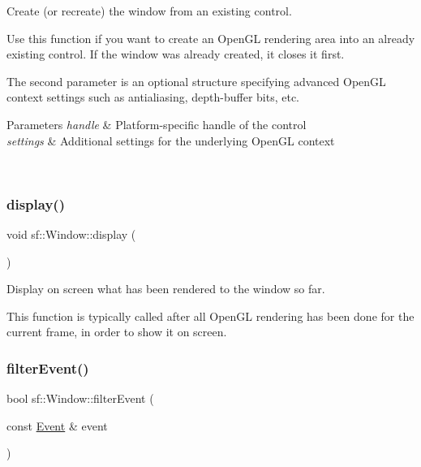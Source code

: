 Create (or recreate) the window from an existing control. 

Use this function if you want to create an Open\+GL rendering area into an already existing control. If the window was already created, it closes it first.

The second parameter is an optional structure specifying advanced Open\+GL context settings such as antialiasing, depth-\/buffer bits, etc.


\begin{DoxyParams}{Parameters}
{\em handle} & Platform-\/specific handle of the control \\
\hline
{\em settings} & Additional settings for the underlying Open\+GL context \begin{DoxyVerb}\end{DoxyVerb}
 \\
\hline
\end{DoxyParams}
\mbox{\label{classsf_1_1_window_adabf839cb103ac96cfc82f781638772a}} 
\subsubsection{\texorpdfstring{display()}{display()}}
{\footnotesize\ttfamily void sf\+::\+Window\+::display (\begin{DoxyParamCaption}{ }\end{DoxyParamCaption})}



Display on screen what has been rendered to the window so far. 

This function is typically called after all Open\+GL rendering has been done for the current frame, in order to show it on screen. \begin{DoxyVerb}\end{DoxyVerb}
 \mbox{\label{classsf_1_1_window_afd3f9e9c21dcd1fd25a38a87026a159b}} 
\subsubsection{\texorpdfstring{filterEvent()}{filterEvent()}}
{\footnotesize\ttfamily bool sf\+::\+Window\+::filter\+Event (\begin{DoxyParamCaption}\item[{const \mbox{\hyperlink{classsf_1_1_event}{Event}} \&}]{event }\end{DoxyParamCaption})\hspace{0.3cm}{\ttfamily [private]}}



